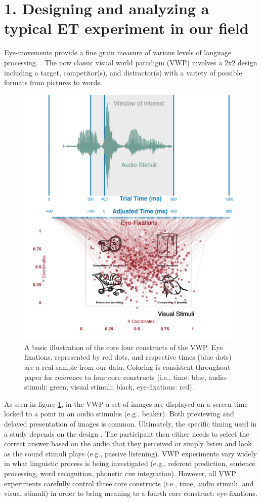 \section{1. Designing and analyzing a typical ET experiment in our field }
Eye-movements provide a fine grain measure of various levels of language processing.
\parencite[e.g.][]{Tanenhaus_Spivey-Knowlton_Eberhard_Sedivy_1995,Allopenna_1998}. The now classic visual world paradigm (VWP) involves a 2x2 design including a target, competitor(s), and distractor(s) with a variety of possible formats from pictures to words.

\begin{figure}[ht]
    \centering
    \includegraphics[height=.8\textwidth]{figures/Core_four_R.jpeg}
    \caption{A basic illustration of the core four constructs of the VWP. Eye fixations, represented by red dots, and respective times (blue dots) are a real sample from our data. Coloring is consistent throughout paper for reference to four core constructs (i.e., time: blue, audio-stimuli: green, visual stimuli: black, eye-fixations: red). }
    \label{fig:core_four}
\end{figure}

As seen in figure \ref{fig:core_four}, in the VWP a set of images are displayed on a screen time-locked to a point in an audio stimulus (e.g., beaker). Both previewing and delayed presentation of images is common. Ultimately, the specific timing used in a study depends on the design  \parencite[see,][, for a review]{Apfelbaum_Klein-Packard_McMurray_2021}{}{}.  The participant then either needs to select the correct answer based on the audio that they perceived or simply listen and look as the sound stimuli plays (e.g., passive listening). VWP experiments vary widely in what linguistic process is being investigated (e.g., referent prediction, sentence processing, word recognition, phonetic cue integration). However, all VWP experiments carefully control three core constructs (i.e., time, audio stimuli, and visual stimuli) in order to bring meaning to a fourth core construct: eye-fixations. 

